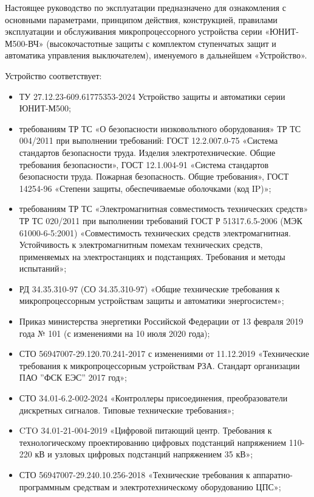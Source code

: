 \par
Настоящее руководство по эксплуатации предназначено для ознакомления с основными параметрами, принципом действия, конструкцией, правилами эксплуатации и обслуживания микропроцессорного устройства серии «ЮНИТ-М500-ВЧ» (высокочастотные защиты с комплектом ступенчатых защит и автоматика управления выключателем), именуемого в дальнейшем «Устройство».

\par
Устройство соответствует:
\begin{itemize}
\item ТУ 27.12.23-609.61775353-2024 Устройство защиты и автоматики серии ЮНИТ-М500;
\item требованиям ТР ТС «О безопасности низковольтного оборудования» ТР ТС 004/2011 при выполнении требований: ГОСТ 12.2.007.0-75 «Система стандартов безопасности труда. Изделия электротехнические. Общие требования безопасности», ГОСТ 12.1.004-91 «Система стандартов безопасности труда. Пожарная безопасность. Общие требования», ГОСТ 14254-96 «Степени защиты, обеспечиваемые оболочками (код IP)»; 
\item требованиям ТР ТС «Электромагнитная совместимость технических средств» ТР ТС 020/2011 при выполнении требований ГОСТ Р 51317.6.5-2006 (МЭК 61000-6-5:2001) «Совместимость технических средств электромагнитная. Устойчивость к электромагнитным помехам технических средств, применяемых на электростанциях и подстанциях. Требования и методы испытаний»;
\item РД 34.35.310-97 (СО 34.35.310-97) «Общие технические требования к микропроцессорным устройствам защиты и автоматики энергосистем»;
\item Приказ министерства энергетики Российской Федерации от 13 февраля 2019 года № 101 (с изменениями на 10 июля 2020 года);
\item СТО 56947007-29.120.70.241-2017 с изменениями от 11.12.2019 «Технические требования к микропроцессорным устройствам РЗА. Стандарт организации ПАО ''ФСК ЕЭС'' 2017 год»;
\item СТО 34.01-6.2-002-2024 «Контроллеры присоединения, преобразователи дискретных сигналов. Типовые технические требования»;
\item CTO 34.01-21-004-2019 «Цифровой питающий центр. Требования к технологическому проектированию цифровых подстанций напряжением 110-220 кВ и узловых цифровых подстанций напряжением 35 кВ»;
\item СТО 56947007-29.240.10.256-2018 «Технические требования к аппаратно-программным средствам и электротехническому оборудованию ЦПС»;

\end{itemize}
